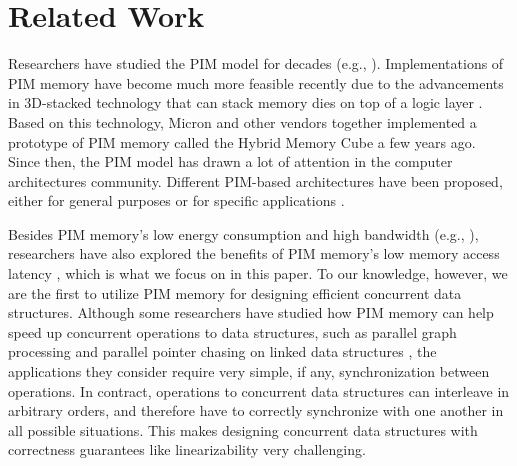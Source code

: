 \section{Related Work}

Researchers have studied the PIM model for decades (e.g., \cite{Stone1970, Kogge1994, 
Gokhale1995, Patterson1997, Oskin1998, KangHYKGLTP99, Hall1999}). 
Implementations of PIM memory have become much more feasible recently due to the advancements 
in 3D-stacked technology that can stack memory dies on top of a logic layer 
\cite{jeddeloh2012, Loh2008, Black2006}. 
Based on this technology, Micron and other vendors together implemented a prototype of 
PIM memory called the Hybrid Memory Cube \cite{website:HMC} a few years ago. 
Since then, the PIM model has drawn a lot of attention in the computer architectures community. 
Different PIM-based architectures have been proposed, either for general purposes or for 
specific applications \cite{Ahn2015:1, Ahn2015:2, Zhang2014:TTP, hsieh2016accelerating,
Azarkhish16, Akin2015:DRM, Azarkhish2015, AzarkhishPRLB17, boroumand2016, ZhuASSHPF13, ZhuGSPF13}.

Besides PIM memory's low energy consumption and high bandwidth 
(e.g., \cite{Ahn2015:2, Zhang2014:TTP, ZhuASSHPF13, AzarkhishPRLB17}), 
researchers have also explored the benefits of PIM memory's low memory access latency
\cite{Loh2008, hsieh2016accelerating, Azarkhish16}, which is what we focus on in this paper. 
To our knowledge, however, we are the first to utilize PIM memory for designing efficient 
concurrent data structures. 
Although some researchers have studied how PIM memory can help speed up concurrent 
operations to data structures, such as parallel graph processing \cite{Ahn2015:2} and  
parallel pointer chasing on linked data structures \cite{hsieh2016accelerating}, 
the applications they consider require very simple, if any, synchronization between operations. 
In contract, operations to concurrent data structures can interleave in arbitrary orders, 
and therefore have to correctly synchronize with one another in all possible situations. 
This makes designing concurrent data structures with correctness guarantees like 
linearizability \cite{Herlihy90} very challenging. 

